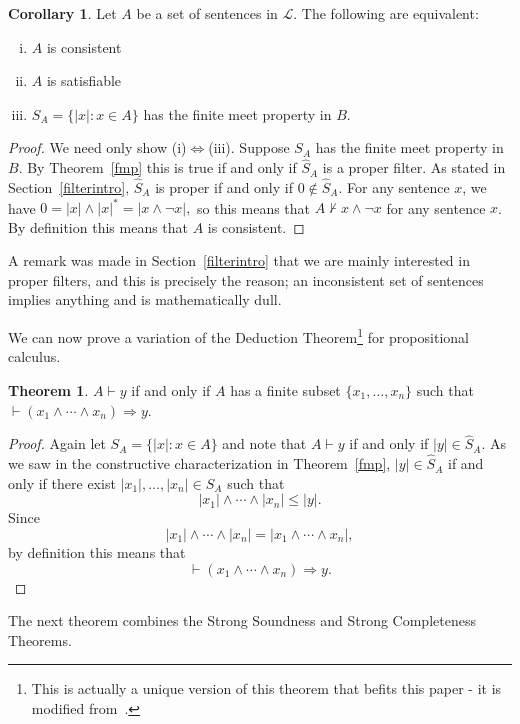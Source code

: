 \documentclass[11pt,titlepage]{article}
\newcommand{\imp}{\Rightarrow}
\newcommand{\ifff}{\Leftrightarrow}
\newcommand{\Lan}{\mathcal{L}}
\theoremstyle{definition}
\newtheorem{theorem}[definition]{Theorem}
\newtheorem{corollary}[definition]{Corollary}
\begin{document}
\begin{corollary} Let $A$ be a set of sentences in $\Lan$. The following are equivalent:
\begin{enumerate}[(i)]
\item $A$ is consistent
\item $A$ is satisfiable
\item $S_A=\{|x|:x\in A\}$ has the finite meet property in $B$.\end{enumerate}\end{corollary}

\begin{proof} We need only show (i)$\ifff$(iii).  Suppose $S_A$ has the finite meet property in $B$. By Theorem~\ref{fmp} this is true if and only if $\hat{S}_A$ is a proper filter. As stated in Section~\ref{filterintro}, $\hat{S}_A$ is proper if and only if $0\notin\hat{S}_A$. For any sentence $x$, we have $0=|x|\land|x|^*=|x\land\neg x|,$ so this means that $A\nvdash x\land\neg x$ for any sentence $x$. By definition this means that $A$ is consistent.
\end{proof}A remark was made in Section~\ref{filterintro} that we are mainly interested in proper filters, and this is precisely the reason; an inconsistent set of sentences implies anything and is mathematically dull.

We can now prove a variation of the Deduction Theorem\footnote{This is actually a unique version of this theorem that befits this paper - it is modified from~\cite{Halmos}.} for propositional calculus.

\begin{theorem}\label{ded_thm}$A\vdash y$ if and only if $A$ has a finite subset $\{x_1,\ldots, x_n\}$ such that $\vdash(x_1\land\cdots\land x_n)\imp y$.\end{theorem}

\begin{proof} Again let $S_A = \{ |x| : x\in A\}$ and note that $A\vdash y$ if and only if $|y|\in\hat{S}_A$. As we saw in the constructive characterization in Theorem~\ref{fmp}, $|y|\in\hat{S}_A$ if and only if there exist $|x_1|,\ldots,|x_n| \in S_A$ such that $$|x_1|\land\cdots\land|x_n| \le |y|.$$ Since $$|x_1| \land \cdots \land |x_n| = |x_1\land\cdots \land x_n|,$$ by definition this means that $$\vdash (x_1 \land \cdots \land x_n) \imp y.$$\end{proof}


The next theorem combines the Strong Soundness and Strong Completeness Theorems.
\end{document}
